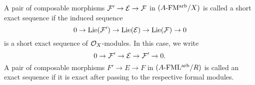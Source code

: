 \documentclass[../main.tex]{subfiles}
\begin{document}
\begin{defi}\label{def:SESofFormalModules}
  A pair of composable morphisms $\mathcal{F}' \to \mathcal{E} \to \mathcal{F}$ in 
  ${({A}\text-\allowbreak\mathrm{FM^{arb}}/{X})}$ is called 
  a short exact sequence if the induced sequence 
  \begin{equation*}
    0 \to \operatorname{Lie}(\mathcal{F}') \to \operatorname{Lie}(\mathcal{E}) \to \operatorname{Lie}(\mathcal{F}) \to 0
  \end{equation*}
  is a short exact sequence of $\mathcal{O}_X$-modules. In this case, we write
  \begin{equation*}
    0 \to \mathcal{F}' \to \mathcal{E} \to \mathcal{F}' \to 0.
  \end{equation*}
  A pair of composable morphisms $F' \to E \to F$ in ${({A}\text-\allowbreak\mathrm{FML^{arb}}/{R})}$
  is called an exact sequence if it is exact after passing to 
  the respective formal modules. 
\end{defi}
\end{document}
